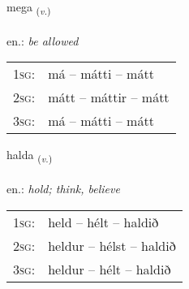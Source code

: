 \documentclass[frontgrid, backgrid]{flacards}\usepackage[]{graphicx}\usepackage[]{xcolor}
\begin{document}
\renewcommand{\blhead}{\vskip5pt {\small\bfseries\footnotesize Sagnorð | Verb }}
\renewcommand{\bcfoot}{\vskip5pt \hspace{2pt}{\small\bfseries\footnotesize 1K}}


{mega \small{\textsubscript{(\textit{v.})}} \\[1ex] %
\textphonetic{[meiːɣa]} \\
en.: \emph{be allowed} \\  [2ex]
\renewcommand*{\arraystretch}{0.8}
\begin{tabular}{p{1cm}l}
\textsc{1sg}: & má -- mátti -- mátt \\ 
\textsc{2sg}: & mátt -- máttir -- mátt \\ 
\textsc{3sg}: & má -- mátti -- mátt \\ 
\end{tabular}
}

\renewcommand{\flhead}{\vskip5pt \fboxsep=0pt {\small\bfseries\footnotesize Sagnorð | Verb}}
\renewcommand{\fcfoot}{\vskip5pt \fboxsep=0pt \hspace{2pt}{\small\bfseries\footnotesize 1K}}

\renewcommand{\blhead}{\vskip5pt {\small\bfseries\footnotesize Sagnorð | Verb }}
\renewcommand{\bcfoot}{\vskip5pt \hspace{2pt}{\small\bfseries\footnotesize 1K}}


{halda \small{\textsubscript{(\textit{v.})}} \\[1ex] %
\textphonetic{[halta]} \\
en.: \emph{hold; think, believe} \\  [2ex]
\renewcommand*{\arraystretch}{0.8}
\begin{tabular}{p{1cm}l}
\textsc{1sg}: & held -- hélt -- haldið \\ 
\textsc{2sg}: & heldur -- hélst -- haldið \\ 
\textsc{3sg}: & heldur -- hélt -- haldið \\ 
\end{tabular}
}

\renewcommand{\flhead}{\vskip5pt \fboxsep=0pt {\small\bfseries\footnotesize Fornafn | Pronoun}}
\renewcommand{\fcfoot}{\vskip5pt \fboxsep=0pt \hspace{2pt}{\small\bfseries\footnotesize 1K}}
\end{document}
